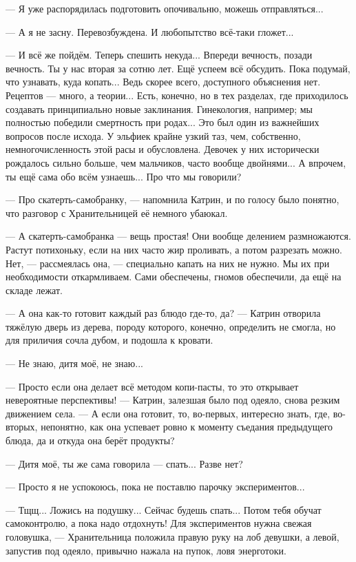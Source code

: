 --- Я уже распорядилась подготовить опочивальню, можешь отправляться...

--- А я не засну. Перевозбуждена. И любопытство всё-таки гложет...

--- И всё же пойдём. Теперь спешить некуда... Впереди вечность, позади вечность. Ты у нас вторая за сотню лет.
Ещё успеем всё обсудить. Пока подумай, что узнавать, куда копать... Ведь скорее всего, доступного объяснения нет.
Рецептов --- много, а теории... Есть, конечно, но в тех разделах, где приходилось создавать принципиально новые заклинания.
Гинекология, например; мы полностью победили смертность при родах... Это был один из важнейших вопросов после исхода.
У эльфиек крайне узкий таз, чем, собственно, немногочисленность этой расы и обусловлена.
Девочек у них исторически рождалось сильно больше, чем мальчиков, часто вообще двойнями...
А впрочем, ты ещё сама обо всём узнаешь... Про что мы говорили?

--- Про скатерть-самобранку, --- напомнила Катрин, и по голосу было понятно, что разговор с Хранительницей её немного убаюкал.

--- А скатерть-самобранка --- вещь простая! Они вообще делением размножаются. Растут потихоньку, если на них часто жир проливать,
а потом разрезать можно. Нет, --- рассмеялась она, --- специально капать на них не нужно.
Мы их при необходимости откармливаем. Сами обеспечены, гномов обеспечили, да ещё на складе лежат.

--- А она как-то готовит каждый раз блюдо где-то, да? --- Катрин отворила тяжёлую дверь из дерева, породу которого,
конечно, определить не смогла, но для приличия сочла дубом, и подошла к кровати.

--- Не знаю, дитя моё, не знаю...

--- Просто если она делает всё методом копи-пасты, то это открывает невероятные перспективы! ---
Катрин, залезшая было под одеяло, снова резким движением села. --- А если она готовит, то,
во-первых, интересно знать, где, во-вторых, непонятно, как она успевает ровно к моменту съедания предыдущего блюда,
да и откуда она берёт продукты?

--- Дитя моё, ты же сама говорила --- спать... Разве нет?

--- Просто я не успокоюсь, пока не поставлю парочку экспериментов...

--- Тщщ... Ложись на подушку... Сейчас будешь спать... Потом тебя обучат самоконтролю, а пока надо отдохнуть!
Для экспериментов нужна свежая головушка, --- Хранительница положила правую руку на лоб девушки,
а левой, запустив под одеяло, привычно нажала на пупок, ловя энерготоки.

